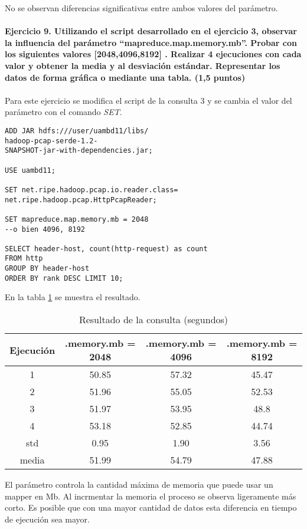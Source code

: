 No se observan diferencias significativas entre ambos valores del parámetro.
\\\\
\textbf{Ejercicio 9. Utilizando el script desarrollado en el ejercicio 3, observar la influencia del parámetro
	“mapreduce.map.memory.mb”. Probar con los siguientes valores [2048,4096,8192] . Realizar 4
	ejecuciones con cada valor y obtener la media y al desviación estándar. Representar los datos de
	forma gráfica o mediante una tabla. (1,5 puntos)}\\\\
Para este ejercicio se modifica el script de la consulta 3 y se cambia el valor del parámetro con el comando \textit{SET}.
\begin{lstlisting}[caption=Consulta para obtener el ranking de hosts (ampliado)]
ADD JAR hdfs:///user/uambd11/libs/
hadoop-pcap-serde-1.2-
SNAPSHOT-jar-with-dependencies.jar;

USE uambd11;

SET net.ripe.hadoop.pcap.io.reader.class=
net.ripe.hadoop.pcap.HttpPcapReader;

SET mapreduce.map.memory.mb = 2048 
--o bien 4096, 8192

SELECT header-host, count(http-request) as count
FROM http 
GROUP BY header-host 
ORDER BY rank DESC LIMIT 10;
\end{lstlisting}
En la tabla \ref{tab:c9} se muestra el resultado.
\begin{table}[ht]
	\centering
	\caption{Resultado de la consulta (segundos)}
	\begin{tabular}[t]{cccc}
		Ejecución & .memory.mb = 2048& .memory.mb = 4096 & .memory.mb = 8192 \\
		\hline
		
		1&50.85&	57.32 & 45.47\\
		2&51.96&	55.05& 52.53\\
		3&51.97&	53.95& 48.8\\
		4&53.18&	52.85& 44.74\\
		\hline
		std &0.95&	1.90 & 3.56
		\\
		media &51.99 & 54.79 & 47.88
		
	\end{tabular}
	\label{tab:c9}
\end{table}%
El parámetro controla la cantidad máxima de memoria que puede usar un mapper en Mb. Al incrmentar la memoria el proceso se observa ligeramente más corto. Es posible que con una mayor cantidad de datos esta diferencia en tiempo de ejecución sea mayor.